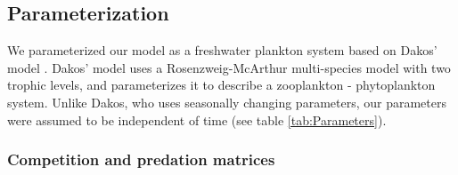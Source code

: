 \subsection{Parameterization}
\label{subsec:Parameterization}
We parameterized our model as a freshwater plankton system based on Dakos' model \citep{Dakos2009b}. Dakos' model uses a Rosenzweig-McArthur multi-species model with two trophic levels, and parameterizes it to describe a zooplankton - phytoplankton system. Unlike Dakos, who uses seasonally changing parameters, our parameters were assumed to be independent of time (see table \ref{tab:Parameters}).

\begin{table}[H]
	\begin{center}
	\end{center}
	\caption{Values and meanings of the parameters used in our numerical experiment. The elements of the predation ($S$) and competition ($A$) matrices are drawn from probability distributions described in subsection \ref{subsubsec:CompetitionParameter}.}
	\label{tab:Parameters}
\end{table}

\subsubsection{Competition and predation matrices}
\label{subsubsec:CompetitionParameter}

